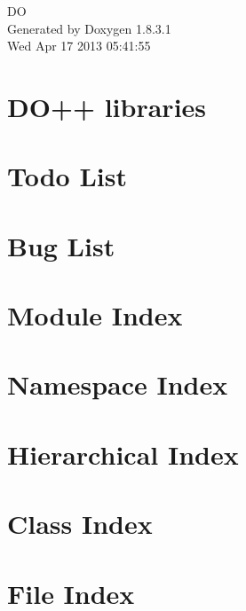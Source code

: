 \documentclass{book}
\begin{document}
\hypersetup{pageanchor=false,citecolor=blue}
\begin{titlepage}
\vspace*{7cm}
\begin{center}
{\Large D\-O }\\
\vspace*{1cm}
{\large Generated by Doxygen 1.8.3.1}\\
\vspace*{0.5cm}
{\small Wed Apr 17 2013 05:41:55}\\
\end{center}
\end{titlepage}
\clearemptydoublepage
{}
\tableofcontents
\clearemptydoublepage
{}
\hypersetup{pageanchor=true,citecolor=blue}
\chapter{D\-O++ libraries}
\label{index}\hypertarget{index}{}
\chapter{Todo List}
\label{todo}
\hypertarget{todo}{}

\chapter{Bug List}
\label{bug}
\hypertarget{bug}{}

\chapter{Module Index}

\chapter{Namespace Index}

\chapter{Hierarchical Index}

\chapter{Class Index}

\chapter{File Index}

\end{document}
